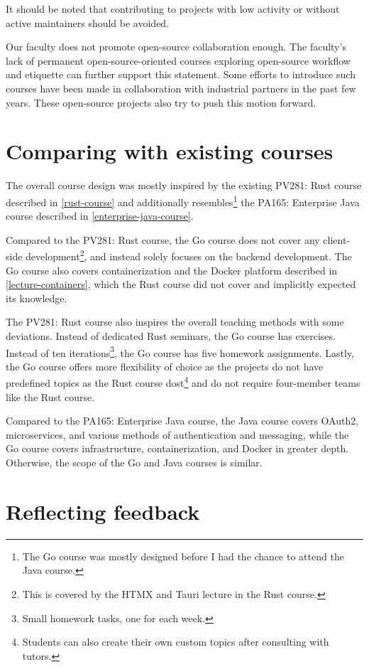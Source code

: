 \documentclass[
  digital,
  color,
  oneside,
  nosansbold,
  nocolorbold,
  nolof,
  nolot,
]{fithesis4}
\begin{document}
It should be noted that contributing to projects with low activity or without active maintainers should be avoided.

Our faculty does not promote open-source collaboration enough. The faculty's lack of permanent open-source-oriented courses exploring open-source workflow and etiquette can further support this statement. Some efforts to introduce such courses have been made in collaboration with industrial partners in the past few years. These open-source projects also try to push this motion forward.

\section{Comparing with existing courses}\label{reflect-course}

The overall course design was mostly inspired by the existing PV281: Rust course described in \cref{rust-course} and additionally resembles\footnote{The Go course was mostly designed before I had the chance to attend the Java course.} the PA165: Enterprise Java course described in \cref{enterprise-java-course}.

Compared to the PV281: Rust course, the Go course does not cover any client-side development\footnote{This is covered by the HTMX and Tauri lecture in the Rust course.}, and instead solely focuses on the backend development. The Go course also covers containerization and the Docker platform described in \cref{lecture-containers}, which the Rust course did not cover and implicitly expected its knowledge. 

The PV281: Rust course also inspires the overall teaching methods with some deviations. Instead of dedicated Rust seminars, the Go course has exercises. Instead of ten iterations\footnote{Small homework tasks, one for each week.}, the Go course has five homework assignments. Lastly, the Go course offers more flexibility of choice as the projects do not have predefined topics as the Rust course dost\footnote{Students can also create their own custom topics after consulting with tutors.} and do not require four-member teams like the Rust course.

Compared to the PA165: Enterprise Java course, the Java course covers OAuth2, microservices, and various methods of authentication and messaging, while the Go course covers infrastructure, containerization, and Docker in greater depth. Otherwise, the scope of the Go and Java courses is similar.

\section{Reflecting feedback}\label{reflect-feedback}
\end{document}

